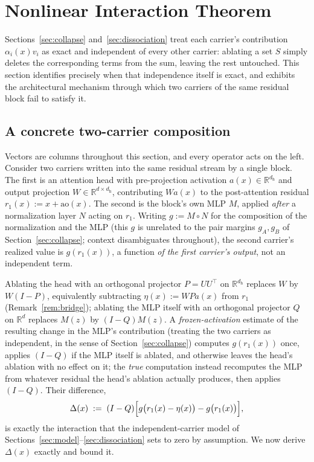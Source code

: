 \documentclass[11pt,a4paper]{article}
\begin{document}
\section{Nonlinear Interaction Theorem}
\label{sec:interaction}

Sections~\ref{sec:collapse} and~\ref{sec:dissociation} treat each carrier's
contribution $\alpha_i(x)v_i$ as exact and independent of every other
carrier: ablating a set $S$ simply deletes the corresponding terms from the
sum, leaving the rest untouched. This section identifies precisely when that
independence itself is exact, and exhibits the architectural mechanism through
which two carriers of the same residual block fail to satisfy it.

\subsection{A concrete two-carrier composition}

Vectors are columns throughout this section, and every operator acts on the
left. Consider two carriers written into the same residual stream by a single
block. The first is an attention head with pre-projection activation
$a(x)\in\mathbb R^{d_{\mathrm h}}$ and output projection
$W\in\mathbb R^{d\times d_{\mathrm h}}$, contributing $W a(x)$ to the
post-attention residual $r_1(x):=x+\mathrm{ao}(x)$. The second is the block's
own MLP $M$, applied \emph{after} a normalization layer $N$ acting on $r_1$.
Writing $g:=M\circ N$ for the composition of the normalization and the MLP
(this $g$ is unrelated to the pair margins $g_A,g_B$ of
Section~\ref{sec:collapse}; context disambiguates throughout), the second
carrier's realized value is $g(r_1(x))$, a function \emph{of the first
carrier's output}, not an independent term.

Ablating the head with an orthogonal projector $P=UU^\top$ on $\mathbb R^{d_{\mathrm h}}$
replaces $W$ by $W(I-P)$, equivalently subtracting $\eta(x):=W P a(x)$ from
$r_1$ (Remark~\ref{rem:bridge}); ablating the MLP itself with an orthogonal projector $Q$
on $\mathbb R^{d}$ replaces $M(z)$ by $(I-Q)M(z)$. A
\emph{frozen-activation} estimate of the resulting change in the MLP's
contribution (treating the two carriers as independent, in the sense of
Section~\ref{sec:collapse}) computes $g(r_1(x))$ once, applies $(I-Q)$ if
the MLP itself is ablated, and otherwise leaves the head's ablation with no
effect on it; the \emph{true} computation instead recomputes the MLP from
whatever residual the head's ablation actually produces, then applies
$(I-Q)$. Their difference,
\[
\Delta(x) \;:=\; (I-Q)\Bigl[g\bigl(r_1(x)-\eta(x)\bigr) - g\bigl(r_1(x)\bigr)\Bigr],
\]
is exactly the interaction that the independent-carrier model of
Sections~\ref{sec:model}--\ref{sec:dissociation} sets to zero by assumption.
We now derive $\Delta(x)$ exactly and bound it.
\end{document}
